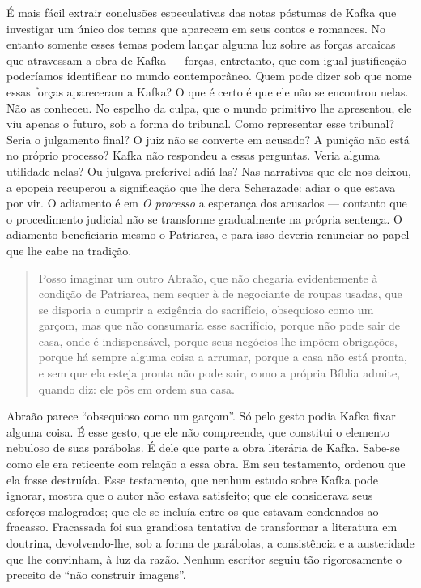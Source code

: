 É mais fácil extrair conclusões especulativas das notas póstumas de
Kafka que investigar um único dos temas que aparecem em seus contos e
romances. No entanto somente esses temas podem lançar alguma luz sobre
as forças arcaicas que atravessam a obra de Kafka --- forças,
entretanto, que com igual justificação poderíamos identificar no mundo
contemporâneo. Quem pode dizer sob que nome essas forças apareceram a
Kafka? O que é certo é que ele não se encontrou nelas. Não as conheceu.
No espelho da culpa, que o mundo primitivo lhe apresentou, ele viu
apenas o futuro, sob a forma do tribunal. Como representar esse
tribunal? Seria o julgamento final? O juiz não se converte em acusado? A
punição não está no próprio processo? Kafka não respondeu a essas
perguntas. Veria alguma utilidade nelas? Ou julgava preferível adiá-las?
Nas narrativas que ele nos deixou, a epopeia recuperou a significação
que lhe dera Scherazade: adiar o que estava por vir. O adiamento é em \textit{O
processo} a esperança dos acusados --- contanto que o procedimento
judicial não se transforme gradualmente na própria sentença. O adiamento
beneficiaria mesmo o Patriarca, e para isso deveria renunciar ao papel
que lhe cabe na tradição. 

\begin{quote}
Posso imaginar um outro Abraão, que não
chegaria evidentemente à condição de Patriarca, nem sequer à de
negociante de roupas usadas, que se disporia a cumprir a exigência do
sacrifício, obsequioso como um garçom, mas que não consumaria esse
sacrifício, porque não pode sair de casa, onde é indispensável, porque
seus negócios lhe impõem obrigações, porque há sempre alguma coisa a
arrumar, porque a casa não está pronta, e sem que ela esteja pronta não
pode sair, como a própria Bíblia admite, quando diz: ele pôs em ordem
sua casa.
\end{quote}

Abraão parece ``obsequioso como um garçom''. Só pelo gesto podia Kafka
fixar alguma coisa. É esse gesto, que ele não compreende, que constitui
o elemento nebuloso de suas parábolas. É dele que parte a obra literária
de Kafka. Sabe-se como ele era reticente com relação a essa obra. Em seu
testamento, ordenou que ela fosse destruída. Esse testamento, que nenhum
estudo sobre Kafka pode ignorar, mostra que o autor não estava
satisfeito; que ele considerava seus esforços malogrados; que ele se
incluía entre os que estavam condenados ao fracasso. Fracassada foi sua
grandiosa tentativa de transformar a literatura em doutrina,
devolvendo-lhe, sob a forma de parábolas, a consistência e a austeridade
que lhe convinham, à luz da razão. Nenhum escritor seguiu tão
rigorosamente o preceito de ``não construir imagens''.

